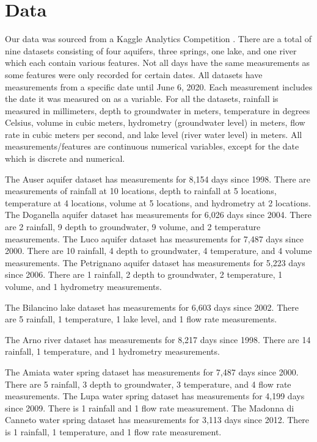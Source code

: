 \documentclass[12pt, letterpaper]{article}
\begin{document}
\section{Data}
Our data was sourced from a Kaggle Analytics Competition \cite{acea2020}. There are a total of nine datasets consisting of four aquifers, three springs, one lake, and one river which each contain various features. Not all days have the same measurements as some features were only recorded for certain dates. All datasets have measurements from a specific date until June 6, 2020. Each measurement includes the date it was measured on as a variable. For all the datasets, rainfall is measured in millimeters, depth to groundwater in meters,  temperature in degrees Celsius, volume in cubic meters, hydrometry (groundwater level) in meters, flow rate in cubic meters per second, and lake level (river water level) in meters. All measurements/features are continuous numerical variables, except for the date which is discrete and numerical.

The Auser aquifer dataset has measurements for 8,154 days since 1998. There are measurements of rainfall at 10 locations, depth to rainfall at 5 locations, temperature at 4 locations, volume at 5 locations, and hydrometry at 2 locations. The Doganella aquifer dataset has measurements for 6,026 days since 2004. There are 2 rainfall, 9 depth to groundwater, 9 volume, and 2 temperature measurements. The Luco aquifer dataset has measurements for 7,487 days since 2000. There are 10 rainfall, 4 depth to groundwater, 4 temperature, and 4 volume measurements. The Petrignano aquifer dataset has measurements for 5,223 days since 2006. There are 1 rainfall, 2 depth to groundwater, 2 temperature, 1 volume, and 1 hydrometry measurements. 

The Bilancino lake dataset has measurements for 6,603 days since 2002. There are 5 rainfall, 1 temperature, 1 lake level, and 1 flow rate measurements. 

The Arno river dataset has measurements for 8,217 days since 1998. There are 14 rainfall, 1 temperature, and 1 hydrometry measurements.

The Amiata water spring dataset has measurements for 7,487 days since 2000. There are 5 rainfall, 3 depth to groundwater, 3 temperature, and 4 flow rate measurements. The Lupa water spring dataset has measurements for 4,199 days since 2009. There is 1 rainfall and 1 flow rate measurement. The Madonna di Canneto water spring dataset has measurements for 3,113 days since 2012. There is 1 rainfall, 1 temperature, and 1 flow rate measurement.
\end{document}
